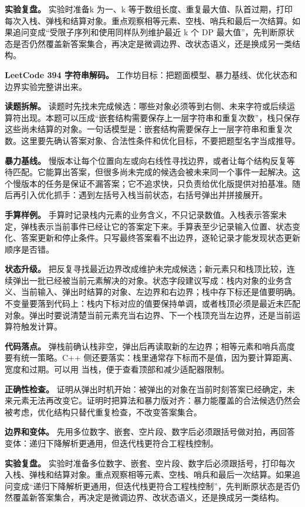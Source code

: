 \textbf{实验复盘。} 实验时准备k 为一、k 等于数组长度、重复最大值、队首过期，打印每次入栈、弹栈和结算对象。重点观察相等元素、空栈、哨兵和最后一次结算。如果追问变成“受限子序列和使用同样队列维护最近 k 个 DP 最大值”，先判断原状态是否仍然覆盖新答案集合，再决定是微调边界、改状态语义，还是换成另一类结构。

\noindent\textbf{LeetCode 394 字符串解码。} 工作坊目标：把题面模型、暴力基线、优化状态和边界实验完整讲出来。

\textbf{读题拆解。} 读题时先找未完成候选：哪些对象必须等到右侧、未来字符或后续运算符出现。本题可以压成“嵌套结构需要保存上一层字符串和重复次数”，栈只保存这些尚未结算的对象。一句话模型是：嵌套结构需要保存上一层字符串和重复次数。这里要先确认答案对象、合法性条件和优化目标，不要把题型名字当成推导。

\textbf{暴力基线。} 慢版本让每个位置向左或向右线性寻找边界，或者让每个结构反复等待匹配。它能算出答案，但很多尚未完成的候选会被未来同一个事件一起解决。这个慢版本的任务是保证不漏答案；它不追求快，只负责给优化版提供对拍基准。随后再引入优化抓手：遇到左括号入栈当前状态，右括号弹出并拼接展开。

\textbf{手算样例。} 手算时记录栈内元素的业务含义，不只记录数值。入栈表示答案未定，弹栈表示当前事件已经让它的答案定下来。手算表至少记录输入位置、状态变化、答案更新和停止条件。只写最终答案看不出边界，逐轮记录才能发现状态更新顺序是否错。

\textbf{状态升级。} 把反复寻找最近边界改成维护未完成候选；新元素只和栈顶比较，连续弹出一批已经被当前元素解决的对象。状态字段建议写成：栈内对象的业务含义、当前输入、弹出时结算的对象、左边界和右边界；栈中存下标还是值要明确。不变量要落到代码上：栈内下标对应的值要保持单调，或者栈顶必须是最近未匹配对象。弹出时要说清楚当前元素充当右边界、下一个栈顶充当左边界，还是当前运算符触发计算。

\textbf{代码落点。} 弹栈前确认栈非空，弹出后再读取新的左边界；相等元素和哨兵高度要有统一策略。C++ 侧还要落实：栈里通常存下标而不是值，因为要计算距离、宽度和过期。可以用  当栈，便于查看顶部和减少适配器限制。

\textbf{正确性检查。} 证明从弹出时机开始：被弹出的对象在当前时刻答案已经确定，未来元素无法再改变它。证明时把算法和暴力版对齐：暴力能覆盖的合法候选仍然会被考虑，优化结构只替代重复检查，不改变答案集合。

\textbf{边界和变体。} 先用多位数字、嵌套、空片段、数字后必须跟括号做对拍，再回答变体：递归下降解析更通用，但迭代栈更符合工程栈控制。

\textbf{实验复盘。} 实验时准备多位数字、嵌套、空片段、数字后必须跟括号，打印每次入栈、弹栈和结算对象。重点观察相等元素、空栈、哨兵和最后一次结算。如果追问变成“递归下降解析更通用，但迭代栈更符合工程栈控制”，先判断原状态是否仍然覆盖新答案集合，再决定是微调边界、改状态语义，还是换成另一类结构。

